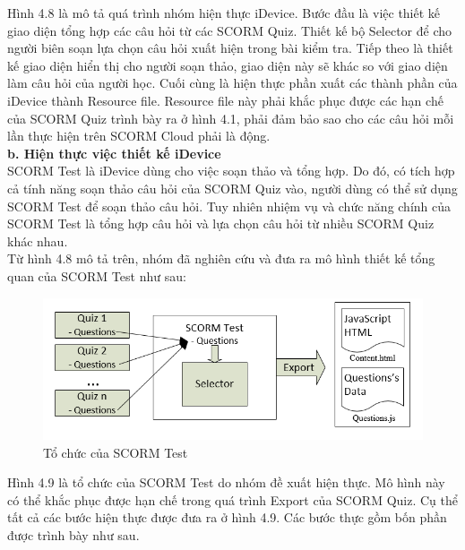 	
\newpage

	Hình 4.8 là mô tả quá trình nhóm hiện thực iDevice. Bước đầu là việc thiết kế giao diện tổng hợp các câu hỏi từ các SCORM Quiz. Thiết kế bộ Selector để cho người biên soạn lựa chọn câu hỏi xuất hiện trong bài kiểm tra. Tiếp theo là thiết kế giao diện hiển thị cho người soạn thảo, giao diện này sẽ khác so với giao diện làm câu hỏi của người học. Cuối cùng là hiện thực phần xuất các thành phần của iDevice  thành Resource file. Resource file này phải khắc phục được các hạn chế của SCORM Quiz trình bày ra ở hình 4.1, phải đảm bảo sao cho các câu hỏi mỗi lần thực hiện trên SCORM Cloud phải là động.\\
	
		
	\textbf{b. Hiện thực việc thiết kế iDevice}\\
	
	SCORM Test là iDevice dùng cho việc soạn thảo và tổng hợp. Do đó, có tích hợp cả tính năng soạn thảo câu hỏi của SCORM Quiz vào, người dùng có thể sử dụng SCORM Test để soạn thảo câu hỏi. Tuy nhiên nhiệm vụ và chức năng chính của SCORM Test là tổng hợp câu hỏi và lựa chọn câu hỏi từ nhiều SCORM Quiz khác nhau. \\
	
	Từ hình 4.8 mô tả trên, nhóm đã nghiên cứu và đưa ra mô hình thiết kế tổng quan của SCORM Test như sau:
	
	\begin{center}
	\begin{figure}[htp]
		\begin{center}
			\includegraphics[width=16cm]{Chapter4/Pictures/picture49.png}
		\end{center}
		\caption{Tổ chức của SCORM Test}
		\label{refpicture57}
	\end{figure}
\end{center}

	Hình 4.9 là tổ chức của SCORM Test do nhóm đề xuất hiện thực. Mô hình này có thể khắc phục được hạn chế trong quá trình Export của SCORM Quiz. Cụ thể tất cả các bước hiện thực được đưa ra ở hình 4.9. Các bước thực gồm bốn phần được trình bày như sau.\\
	
